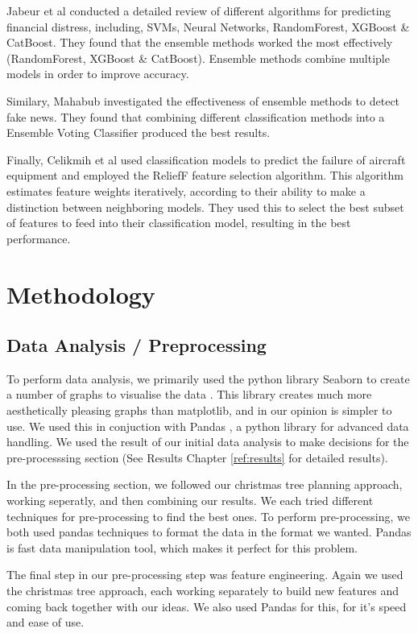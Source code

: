 \documentclass[conference]{IEEEtran}
\begin{document}
Jabeur et al \cite{JABEUR2021} conducted a detailed review of different algorithms for predicting financial distress, including, SVMs, Neural Networks, RandomForest, XGBoost \& CatBoost. They found that the ensemble methods worked the most effectively (RandomForest, XGBoost \& CatBoost). Ensemble methods combine multiple models in order to improve accuracy. 

Similary, Mahabub \cite{Mahabub2020} investigated the effectiveness of ensemble methods to detect fake news. They found that combining different classification methods into a Ensemble Voting Classifier produced the best results.

Finally, Celikmih et al \cite{celikmih2020} used classification models to predict the failure of aircraft equipment and employed the ReliefF feature selection algorithm. This algorithm estimates feature weights iteratively, according to their ability to make a distinction between neighboring models. They used this to select the best subset of features to feed into their classification model, resulting in the best performance.

\section{Methodology}

\subsection{Data Analysis / Preprocessing}

To perform data analysis, we primarily used the python library Seaborn to create a number of graphs to visualise the data \cite{seaborn}. This library creates much more aesthetically pleasing graphs than matplotlib, and in our opinion is simpler to use. We used this in conjuction with Pandas \cite{pandas}, a python library for advanced data handling. We used the result of our initial data analysis to make decisions for the pre-processsing section (See Results Chapter \ref{ref:results} for detailed results). 

In the pre-processing section, we followed our christmas tree planning approach, working seperatly, and then combining our results. We each tried different techniques for pre-processing to find the best ones. To perform pre-processing, we both used pandas techniques to format the data in the format we wanted. Pandas is fast data manipulation tool, which makes it perfect for this problem.

The final step in our pre-processing step was feature engineering. Again we used the christmas tree approach, each working separately to build new features and coming back together with our ideas. We also used Pandas for this, for it's speed and ease of use.
\end{document}
